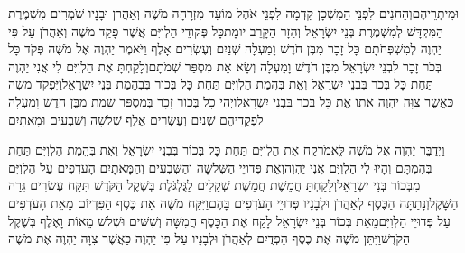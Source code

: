 \documentclass[../main/main.tex]{subfiles}
\begin{document}
\begin{multicols}{\ncols}
וּמֵיתְרֵיהֶם\PreVerseSpace{}וְהַחֹנִים לִפְנֵי הַמִּשְׁכָּן קֵדְמָה לִפְנֵי אֹהֶל מוֹעֵד מִזְרָחָה מֹשֶׁה וְאַהֲרֹן וּבָנָיו שֹׁמְרִים מִשְׁמֶרֶת הַמִּקְדָּשׁ לְמִשְׁמֶרֶת בְּנֵי יִשְׂרָאֵל וְהַזָּר הַקָּרֵב יוּמָת\PreVerseSpace{}כָּל פְּקוּדֵי הַלְוִיִּם אֲשֶׁר פָּקַד מֹשֶׁה וְאַהֲרֹן עַל פִּי יַהְוֶה לְמִשְׁפְּחֹתָם כָּל זָכָר מִבֶּן חֹדֶשׁ וָמַעְלָה שְׁנַיִם וְעֶשְׂרִים אָלֶף \ClosedSection{}וַיֹּאמֶר יַהְוֶה אֶל מֹשֶׁה פְּקֹד כָּל בְּכֹר זָכָר לִבְנֵי יִשְׂרָאֵל מִבֶּן חֹדֶשׁ וָמָעְלָה וְשָׂא אֵת מִסְפַּר שְׁמֹתָם\PreVerseSpace{}וְלָקַחְתָּ אֶת הַלְוִיִּם לִי אֲנִי יַהְוֶה תַּחַת כָּל בְּכֹר בִּבְנֵי יִשְׂרָאֵל וְאֵת בֶּהֱמַת הַלְוִיִּם תַּחַת כָּל בְּכוֹר בְּבֶהֱמַת בְּנֵי יִשְׂרָאֵל\PreVerseSpace{}וַיִּפְקֹד מֹשֶׁה כַּאֲשֶׁר צִוָּה יַהְוֶה אֹתוֹ אֶת כָּל בְּכֹר בִּבְנֵי יִשְׂרָאֵל\PreVerseSpace{}וַיְהִי כָל בְּכוֹר זָכָר בְּמִסְפַּר שֵׁמֹת מִבֶּן חֹדֶשׁ וָמַעְלָה לִפְקֻדֵיהֶם שְׁנַיִם וְעֶשְׂרִים אֶלֶף שְׁלֹשָׁה וְשִׁבְעִים וּמָאתָיִם\OpenSection{}\par
{}וַיְדַבֵּר יַהְוֶה אֶל מֹשֶׁה לֵּאמֹר\PreVerseSpace{}קַח אֶת הַלְוִיִּם תַּחַת כָּל בְּכוֹר בִּבְנֵי יִשְׂרָאֵל וְאֶת בֶּהֱמַת הַלְוִיִּם תַּחַת בְּהֶמְתָּם וְהָיוּ לִי הַלְוִיִּם אֲנִי יַהְוֶה\PreVerseSpace{}וְאֵת פְּדוּיֵי הַשְּׁלֹשָׁה וְהַשִּׁבְעִים וְהַמָּאתָיִם הָעֹדְפִים עַל הַלְוִיִּם מִבְּכוֹר בְּנֵי יִשְׂרָאֵל\PreVerseSpace{}וְלָקַחְתָּ חֲמֵשֶׁת חֲמֵשֶׁת שְׁקָלִים לַגֻּלְגֹּלֶת בְּשֶׁקֶל הַקֹּדֶשׁ תִּקָּח עֶשְׂרִים גֵּרָה הַשָּׁקֶל\PreVerseSpace{}וְנָתַתָּה הַכֶּסֶף לְאַהֲרֹן וּלְבָנָיו פְּדוּיֵי הָעֹדְפִים בָּהֶם\PreVerseSpace{}וַיִּקַּח מֹשֶׁה אֵת כֶּסֶף הַפִּדְיוֹם מֵאֵת הָעֹדְפִים עַל פְּדוּיֵי הַלְוִיִּם\PreVerseSpace{}מֵאֵת בְּכוֹר בְּנֵי יִשְׂרָאֵל לָקַח אֶת הַכָּסֶף חֲמִשָּׁה וְשִׁשִּׁים וּשְׁלֹשׁ מֵאוֹת וָאֶלֶף בְּשֶׁקֶל הַקֹּדֶשׁ\PreVerseSpace{}וַיִּתֵּן מֹשֶׁה אֶת כֶּסֶף הַפְּדֻיִם לְאַהֲרֹן וּלְבָנָיו עַל פִּי יַהְוֶה כַּאֲשֶׁר צִוָּה יַהְוֶה אֶת מֹשֶׁה\OpenSection{}\par

\end{multicols}
\end{document}

